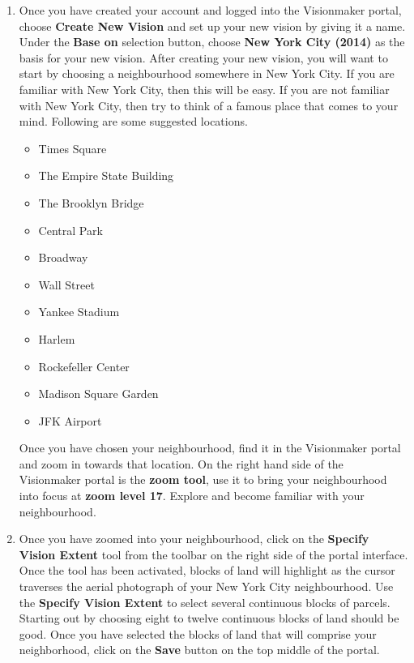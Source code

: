 \documentclass{article}
\begin{document}
\begin{enumerate}[leftmargin=15mm]

\item Once you have created your account and logged into the Visionmaker portal, choose \textbf{Create New Vision} and set up your new vision by giving it a name.  Under the \textbf{Base on} selection button, choose \textbf{New York City (2014)} as the basis for your new vision.  After creating your new vision, you will want to start by choosing a neighbourhood somewhere in New York City.  If you are familiar with New York City, then this will be easy.  If you are not familiar with New York City, then try to think of a famous place that comes to your mind.  Following are some suggested locations.

\begin{itemize}

\item Times Square
\item The Empire State Building
\item The Brooklyn Bridge
\item Central Park
\item Broadway
\item Wall Street
\item Yankee Stadium
\item Harlem
\item Rockefeller Center
\item Madison Square Garden
\item JFK Airport

\end{itemize}

Once you have chosen your neighbourhood, find it in the Visionmaker portal and zoom in towards that location.  On the right hand side of the Visionmaker portal is the \textbf{zoom tool}, use it to bring your neighbourhood into focus at \textbf{zoom level 17}.  Explore and become familiar with your neighbourhood.

\item Once you have zoomed into your neighbourhood, click on the \textbf{Specify Vision Extent} tool from the toolbar on the right side of the portal interface.  Once the tool has been activated, blocks of land will highlight as the cursor traverses the aerial photograph of your New York City neighbourhood.  Use the \textbf{Specify Vision Extent} to select several continuous blocks of parcels.  Starting out by choosing eight to twelve continuous blocks of land should be good.  Once you have selected the blocks of land that will comprise your neighborhood, click on the \textbf{Save} button on the top middle of the portal.


\end{enumerate}
\end{document}
